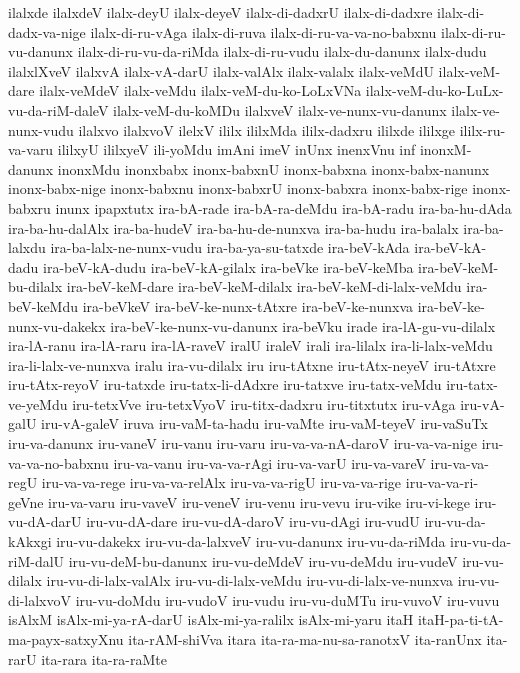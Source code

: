 {ilalxde
ilalxdeV
ilalx-deyU
ilalx-deyeV
ilalx-di-dadxrU
ilalx-di-dadxre
ilalx-di-dadx-va-nige
ilalx-di-ru-vAga
ilalx-di-ruva
ilalx-di-ru-va-va-no-babxnu
ilalx-di-ru-vu-danunx
ilalx-di-ru-vu-da-riMda
ilalx-di-ru-vudu
ilalx-du-danunx
ilalx-dudu
ilalxlXveV
ilalxvA
ilalx-vA-darU
ilalx-valAlx
ilalx-valalx
ilalx-veMdU
ilalx-veM-dare
ilalx-veMdeV
ilalx-veMdu
ilalx-veM-du-ko-LoLxVNa
ilalx-veM-du-ko-LuLx-vu-da-riM-daleV
ilalx-veM-du-koMDu
ilalxveV
ilalx-ve-nunx-vu-danunx
ilalx-ve-nunx-vudu
ilalxvo
ilalxvoV
ilelxV
ililx
ililxMda
ililx-dadxru
ililxde
ililxge
ililx-ru-va-varu
ililxyU
ililxyeV
ili-yoMdu
imAni
imeV
inUnx
inenxVnu
inf
inonxM-danunx
inonxMdu
inonxbabx
inonx-babxnU
inonx-babxna
inonx-babx-nanunx
inonx-babx-nige
inonx-babxnu
inonx-babxrU
inonx-babxra
inonx-babx-rige
inonx-babxru
inunx
ipapxtutx
ira-bA-rade
ira-bA-ra-deMdu
ira-bA-radu
ira-ba-hu-dAda
ira-ba-hu-dalAlx
ira-ba-hudeV
ira-ba-hu-de-nunxva
ira-ba-hudu
ira-balalx
ira-ba-lalxdu
ira-ba-lalx-ne-nunx-vudu
ira-ba-ya-su-tatxde
ira-beV-kAda
ira-beV-kA-dadu
ira-beV-kA-dudu
ira-beV-kA-gilalx
ira-beVke
ira-beV-keMba
ira-beV-keM-bu-dilalx
ira-beV-keM-dare
ira-beV-keM-dilalx
ira-beV-keM-di-lalx-veMdu
ira-beV-keMdu
ira-beVkeV
ira-beV-ke-nunx-tAtxre
ira-beV-ke-nunxva
ira-beV-ke-nunx-vu-dakekx
ira-beV-ke-nunx-vu-danunx
ira-beVku
irade
ira-lA-gu-vu-dilalx
ira-lA-ranu
ira-lA-raru
ira-lA-raveV
iralU
iraleV
irali
ira-lilalx
ira-li-lalx-veMdu
ira-li-lalx-ve-nunxva
iralu
ira-vu-dilalx
iru
iru-tAtxne
iru-tAtx-neyeV
iru-tAtxre
iru-tAtx-reyoV
iru-tatxde
iru-tatx-li-dAdxre
iru-tatxve
iru-tatx-veMdu
iru-tatx-ve-yeMdu
iru-tetxVve
iru-tetxVyoV
iru-titx-dadxru
iru-titxtutx
iru-vAga
iru-vA-galU
iru-vA-galeV
iruva
iru-vaM-ta-hadu
iru-vaMte
iru-vaM-teyeV
iru-vaSuTx
iru-va-danunx
iru-vaneV
iru-vanu
iru-varu
iru-va-va-nA-daroV
iru-va-va-nige
iru-va-va-no-babxnu
iru-va-vanu
iru-va-va-rAgi
iru-va-varU
iru-va-vareV
iru-va-va-regU
iru-va-va-rege
iru-va-va-relAlx
iru-va-va-rigU
iru-va-va-rige
iru-va-va-ri-geVne
iru-va-varu
iru-vaveV
iru-veneV
iru-venu
iru-vevu
iru-vike
iru-vi-kege
iru-vu-dA-darU
iru-vu-dA-dare
iru-vu-dA-daroV
iru-vu-dAgi
iru-vudU
iru-vu-da-kAkxgi
iru-vu-dakekx
iru-vu-da-lalxveV
iru-vu-danunx
iru-vu-da-riMda
iru-vu-da-riM-dalU
iru-vu-deM-bu-danunx
iru-vu-deMdeV
iru-vu-deMdu
iru-vudeV
iru-vu-dilalx
iru-vu-di-lalx-valAlx
iru-vu-di-lalx-veMdu
iru-vu-di-lalx-ve-nunxva
iru-vu-di-lalxvoV
iru-vu-doMdu
iru-vudoV
iru-vudu
iru-vu-duMTu
iru-vuvoV
iru-vuvu
isAlxM
isAlx-mi-ya-rA-darU
isAlx-mi-ya-ralilx
isAlx-mi-yaru
itaH
itaH-pa-ti-tA-ma-payx-satxyXnu
ita-rAM-shiVva
itara
ita-ra-ma-nu-sa-ranotxV
ita-ranUnx
ita-rarU
ita-rara
ita-ra-raMte
}
